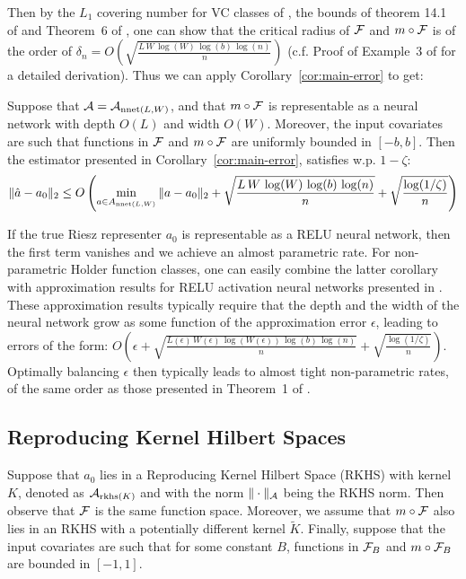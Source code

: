 Then by the $L_1$ covering number for VC classes of \cite{haussler1995sphere}, the bounds of theorem 14.1 of \cite{anthony2009neural} and Theorem~6 of \cite{bartlett2019nearly}, one can show that the critical radius of ${\mathcal F}$ and $m\circ {\mathcal F}$ is of the order of $\delta_n=O\left(\sqrt{\frac{L\, W\, \log(W)\,\log(b)\, \log(n)}{n}}\right)$ (c.f. Proof of Example~3 of \cite{foster2019orthogonal} for a detailed derivation). Thus we can apply Corollary~\ref{cor:main-error} to get:
\begin{corollary}
    Suppose that ${\mathcal A}={\mathcal A}_{\text{nnet}(L,W)}$, and that $m\circ {\mathcal F}$ is representable as a neural network with depth $O(L)$ and width $O(W)$. Moreover, the input covariates are such that functions in ${\mathcal F}$ and $m\circ {\mathcal F}$ are uniformly bounded in $[-b,b]$. Then the estimator presented in Corollary~\ref{cor:main-error}, satisfies w.p. $1-\zeta$:
    \begin{equation}
        \|\hat{a}-a_0\|_{2} \leq O\left(\min_{a\in A_{\text{nnet}(L,W)}} \|a-a_0\|_2 + \sqrt{\frac{L\, W\, \log(W)\,\log(b)\, \log(n)}{n}} + \sqrt{\frac{\log(1/\zeta)}{n}}\right)
    \end{equation}
\end{corollary}

If the true Riesz representer $a_0$ is representable as a RELU neural network, then the first term vanishes and we achieve an almost parametric rate. For non-parametric Holder function classes, one can easily combine the latter corollary with approximation results for RELU activation neural networks presented in \cite{yarotsky2017error,yarotsky2018optimal}. These approximation results typically require that the depth and the width of the neural network grow as some function of the approximation error $\epsilon$, leading to errors of the form: $O\left(\epsilon + \sqrt{\frac{L(\epsilon)\, W(\epsilon)\, \log(W(\epsilon))\,\log(b)\, \log(n)}{n}} + \sqrt{\frac{\log(1/\zeta)}{n}}\right)$. Optimally balancing $\epsilon$ then typically leads to almost tight non-parametric rates, of the same order as those presented in Theorem~1 of \cite{farrell2018DeepNeural}.

\subsection{Reproducing Kernel Hilbert Spaces}

Suppose that $a_0$ lies in a Reproducing Kernel Hilbert Space (RKHS) with kernel $K$, denoted as ${\mathcal A}_{\text{rkhs}(K)}$ and with the norm $\|\cdot\|_{{\mathcal A}}$ being the RKHS norm. Then observe that ${\mathcal F}$ is the same function space. Moreover, we assume that $m\circ {\mathcal F}$ also lies in an RKHS with a potentially different kernel $\tilde{K}$. Finally, suppose that the input covariates are such that for some constant $B$, functions in ${\mathcal F}_B$ and $m\circ {\mathcal F}_B$ are bounded in $[-1, 1]$. 

